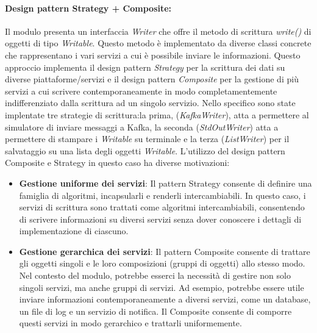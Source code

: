\paragraph{Design pattern Strategy + Composite:}
Il modulo presenta un interfaccia \textit{Writer} che offre il metodo di scrittura \textit{write()} di oggetti di tipo \textit{Writable}.
Questo metodo è implementato da diverse classi concrete che rappresentano i vari servizi a cui è possibile inviare le informazioni.
Questo approccio implementa il design pattern \textit{Strategy} per la scrittura dei dati su diverse piattaforme/servizi e il design pattern \textit{Composite} per la gestione di più servizi a cui scrivere contemporaneamente in modo completamentemente indifferenziato dalla scrittura ad un singolo servizio.
Nello specifico sono state implentate tre strategie di scrittura:la prima, (\textit{KafkaWriter}), atta a permettere al simulatore di inviare messaggi a Kafka,  la seconda (\textit{StdOutWriter}) atta a permettere di stampare i \textit{Writable} su terminale e la terza (\textit{ListWriter}) per il salvataggio su una lista degli oggetti \textit{Writable}.
L'utilizzo del design pattern Composite e Strategy in questo caso ha diverse motivazioni:
\begin{itemize}
    \item \textbf{Gestione uniforme dei servizi}: Il pattern Strategy consente di definire una famiglia di algoritmi, incapsularli e renderli intercambiabili. In questo caso, i servizi di scrittura sono trattati come algoritmi intercambiabili, consentendo di scrivere informazioni su diversi servizi senza dover conoscere i dettagli di implementazione di ciascuno.
    \item \textbf{Gestione gerarchica dei servizi}: Il pattern Composite consente di trattare gli oggetti singoli e le loro composizioni (gruppi di oggetti) allo stesso modo. Nel contesto del modulo, potrebbe esserci la necessità di gestire non solo singoli servizi, ma anche gruppi di servizi. Ad esempio, potrebbe essere utile inviare informazioni contemporaneamente a diversi servizi, come un database, un file di log e un servizio di notifica. Il Composite consente di comporre questi servizi in modo gerarchico e trattarli uniformemente.
\end{itemize}

